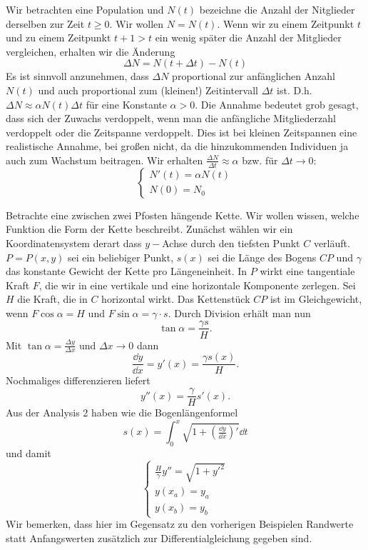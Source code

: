 \begin{beispiel}
	Wir betrachten eine Population und $ N(t) $ bezeichne die Anzahl der Nitglieder derselben zur Zeit $ t\geq 0 $. Wir wollen $ N=N(t) $. Wenn wir zu einem Zeitpunkt $ t $ und zu einem Zeitpunkt $ t+1>t $ ein wenig sp\"ater die Anzahl der Mitglieder vergleichen, erhalten wir die \"Anderung
	\[ \Delta N=N(t+\Delta t)-N(t) \]
	Es ist sinnvoll anzunehmen, dass $ \Delta N $ proportional zur anf\"anglichen Anzahl $ N(t) $ und auch proportional zum (kleinen!) Zeitintervall $ \Delta t $ ist. D.h. $ \Delta N\approx \alpha N(t)\Delta t $ f\"ur eine Konstante $ \alpha>0 $. Die Annahme bedeutet grob gesagt, dass sich der Zuwachs verdoppelt, wenn man die anf\"angliche Mitgliederzahl verdoppelt oder die Zeitspanne verdoppelt. Dies ist bei kleinen Zeitspannen eine realistische Annahme, bei gro\ss en nicht, da die hinzukommenden Individuen ja auch zum Wachstum beitragen. Wir erhalten $ \frac{\Delta N}{\Delta t}\approx\alpha $ bzw. f\"ur $ \Delta t\rightarrow 0 $:
	\[ \begin{cases}
	N'(t)=\alpha N(t)\\N(0)=N_0
	\end{cases} \]
\end{beispiel}
\begin{beispiel}[Kettenlinie]
	Betrachte eine zwischen zwei Pfosten h\"angende Kette. Wir wollen wissen, welche Funktion die Form der Kette beschreibt. Zun\"achst w\"ahlen wir ein Koordinatensystem derart dass $ y- $Achse durch den tiefsten Punkt $ C $ verl\"auft.\\
	$ P=P(x,y) $ sei ein beliebiger Punkt, $s(x)$ sei die L\"ange des Bogens $ CP $ und $ \gamma $ das konstante Gewicht der Kette pro L\"angeneinheit. In $ P $ wirkt eine tangentiale Kraft $ F $, die wir in eine vertikale und eine horizontale Komponente zerlegen. Sei $ H $ die Kraft, die in $ C $ horizontal wirkt. Das Kettenst\"uck $ CP $ ist im Gleichgewicht, wenn $ F\cos\alpha=H $ und $ F\sin\alpha=\gamma\cdot s $. Durch Division erh\"alt man nun
	\[ \tan\alpha=\frac{\gamma s}{H}. \]
	Mit $ \tan\alpha=\frac{\Delta y}{\Delta x} $ und $ \Delta x\rightarrow 0 $ dann
	\[ \frac{\dd y}{\dd x}=y'(x)=\frac{\gamma s(x)}{H}. \]
	Nochmaliges differenzieren liefert
	\[ y''(x)=\frac{\gamma}{H}s'(x). \]
	Aus der Analysis 2 haben wie die Bogenl\"angenformel
	\[ s(x)=\int_0^x\sqrt{1+\left(\tfrac{\dd y}{\dd x}\right)'}\dd t \]
	und damit
	\[ \begin{cases}
	\frac{H}{\gamma}y''=\sqrt{1+y'^2}\\y(x_a)=y_a\\y(x_b)=y_b
	\end{cases} \]
	Wir bemerken, dass hier im Gegensatz zu den vorherigen Beispielen Randwerte statt Anfangswerten zus\"atzlich zur Differentialgleichung gegeben sind.
\end{beispiel}
